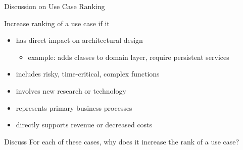\documentclass[10pt,t,a4paper]{beamer}
\begin{document}
\begin{frame}[label=sec-1-10]{Discussion on Use Case Ranking}
\begin{block}{Increase ranking of a use case if it}
\begin{itemize}
\item has direct impact on architectural design
\begin{itemize}
\item example: adds classes to domain layer, require persistent services
\end{itemize}
\item includes risky, time-critical, complex functions
\item involves new research or technology
\item represents primary business processes
\item directly supports revenue or decreased costs
\end{itemize}
\end{block}
\begin{block}{Discuss}
For each of these cases, why does it increase the rank of a use case?
\end{block}
\end{frame}
\end{document}
